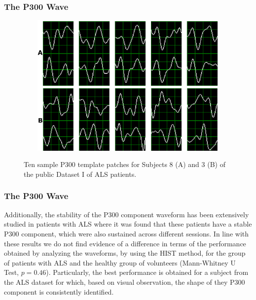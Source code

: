 \documentclass[aspectratio=169]{beamer}
\begin{document}
\begin{frame}
\frametitle{The P300 Wave}
\begin{center}
\begin{figure}[h!]
\centering
\includegraphics[height=7cm,width=1\textwidth]{images/subject.png}\label{subject8}
\caption[Sample P300 Patches]{Ten sample P300 template patches for Subjects 8 (A) and 3 (B) of the public Dataset I of ALS patients.}  %
\label{fig:p300templates}
\end{figure}
\end{center}
\end{frame} 

\begin{frame}
\frametitle{The P300 Wave}
\begin{center}
Additionally, the stability of the P300 component waveform has been extensively studied in patients with ALS \cite{SellersandEmanuelDonchin2006,TomohiroMadarame2008,Nijboer2009,Mak2012,McCane2015} where it was found that these patients have a stable P300 component, which were also sustained across different sessions.  In line with these results we do not find evidence of a difference in terms of the performance obtained by analyzing the waveforms, by using the HIST method, for the group of patients with ALS and the healthy group of volunteers (Mann-Whitney U Test, $p=0.46$). Particularly, the best performance is obtained for a subject from the ALS dataset for which, based on visual observation, the shape of they P300 component is consistently identified.
\end{center}
\end{frame} 
    

    
\end{document}

